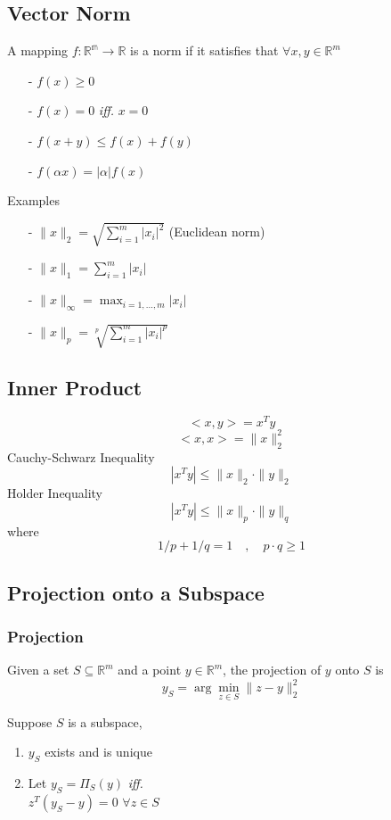 \begin{multicols}{2}
\subsection{Vector Norm}
A mapping $f:\mathbb{R^m}\to\mathbb{R}$ is a norm if it satisfies that $\forall x,y\in\mathbb{R}^m$
\begin{itemize}
    \item [-] $f(x)\geq 0$
    \item [-] $f(x)= 0$ \emph{iff.} $x=0$
    \item [-] $f(x+y)\leq f(x)+f(y)$
    \item [-] $f(\alpha x)=|\alpha|f(x)$
\end{itemize}
Examples
\begin{itemize}
    \item [-] $\|x\|_2=\sqrt{\sum_{i=1}^m|x_i|^2}$ (Euclidean norm)
    \item [-] $\|x\|_1=\sum_{i=1}^m|x_i|$
    \item [-] $\|x\|_\infty=\max_{i=1,...,m}|x_i|$
    \item [-] $\|x\|_p=\sqrt[p]{\sum_{i=1}^m|x_i|^p}$
\end{itemize}

\subsection{Inner Product}
\[
    <x,y>=x^Ty
\]
\[
    <x,x>=\|x\|_2^2
\]
Cauchy-Schwarz Inequality 
\[
    |x^Ty|\leq \|x\|_2\cdot \|y\|_2
\]
Holder Inequality
\[
    |x^Ty|\leq \|x\|_p\cdot \|y\|_q
\]
where
\[
    1/p+1/q=1\quad ,\quad p\cdot q\geq 1
\]

\subsection{Projection onto a Subspace}
\subsubsection{Projection}
Given a set $S\subseteq \mathbb{R}^m$ and a point $y\in\mathbb{R}^m$, the projection of $y$ onto $S$ is
\[
    y_S=\arg \min_{z\in S} \|z-y\|_2^2
\]
\begin{theorem}
    Suppose $S$ is a subspace,
    \begin{enumerate}
        \item $y_S$ exists and is unique
        \item Let $y_S=\Pi_S(y)$ \emph{iff.} \\
        $z^T(y_S-y)=0$ $\forall z\in S$
    \end{enumerate}    
\end{theorem}


\end{multicols}
